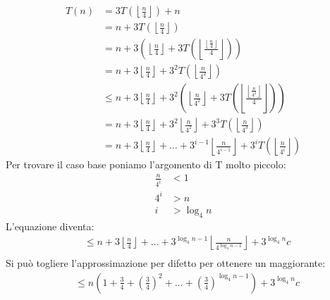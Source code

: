 \documentclass[a4paper]{article}
\begin{document}
\begin{example}
  \[
    \begin{aligned}
      T(n) & = 3T \left( \left\lfloor \frac{n}{4} \right\rfloor \right) + n\\
           & = n + 3T \left( \left\lfloor \frac{n}{4} \right\rfloor \right)\\
           & = n + 3 \left( \left\lfloor \frac{n}{4} \right\rfloor + 3T 
           \left( \left\lfloor \frac{\left\lfloor \frac{n}{4} \right\rfloor}{4} \right\rfloor
           \right)  \right)\\
           & = n + 3 \left\lfloor \frac{n}{4} \right\rfloor + 3^2 T 
           \left( \left\lfloor \frac{n}{4^2} \right\rfloor \right)\\
           & \le n + 3 \left\lfloor \frac{n}{4} \right\rfloor + 3^2 
           \left( \left\lfloor \frac{n}{4^2} \right\rfloor + 3T \left( 
           \left\lfloor \frac{\left\lfloor \frac{n}{4^2} \right\rfloor}{4} \right\rfloor
           \right)  \right) \\
           & = n + 3 \left\lfloor \frac{n}{4} \right\rfloor + 3^2
           \left\lfloor \frac{n}{4^2} \right\rfloor + 3^3 T
           \left( \left\lfloor \frac{n}{4^3} \right\rfloor \right) \\
           & = n + 3 \left\lfloor \frac{n}{4} \right\rfloor + \ldots + 3^{i-1}
           \left\lfloor \frac{n}{4^{i-1}} \right\rfloor + 3^i T
           \left( \left\lfloor \frac{n}{4^i} \right\rfloor \right) 
    \end{aligned}
  \] 
  Per trovare il caso base poniamo l'argomento di T molto piccolo:
  \[
    \begin{aligned}
      \frac{n}{4^i} & < 1\\
      4^i & > n\\
      i & > \log_4 n
    \end{aligned}
  \] 
  L'equazione diventa:
  \[
    \begin{aligned}
      & \le n + 3 \left\lfloor \frac{n}{4} \right\rfloor + \ldots + 3^{\log_4 n - 1}
      \left\lfloor \frac{n}{4^{\log_4 n - 1}} \right\rfloor + 3^{\log_4 n} c\\
    \end{aligned}
  \] 
  Si può togliere l'approssimazione per difetto per ottenere un maggiorante:
  \[
  \begin{aligned}
    & \le n \left( 1 + \frac{3}{4} + \left( \frac{3}{4} \right)^2 + \ldots +
    \left( \frac{3}{4} \right)^{\log_4 n-1} \right) + 3^{\log_4 n} c\\

\end{aligned}\]
\end{example}
\end{document}
